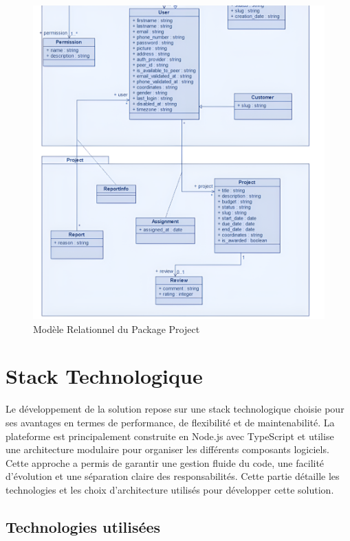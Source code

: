 {\begin{figure}[H]
\begin{center}
\includegraphics[width=15cm]{assets/diagrams/ProjectUC.png}
\end{center}
\caption{Modèle Relationnel du Package Project}
\end{figure}

\vspace{0.35cm}

\section{Stack Technologique}
Le développement de la solution repose sur une stack technologique choisie pour ses avantages en termes de performance, de flexibilité et de maintenabilité. La plateforme est principalement construite en Node.js avec TypeScript et utilise une architecture modulaire pour organiser les différents composants logiciels. Cette approche a permis de garantir une gestion fluide du code, une facilité d'évolution et une séparation claire des responsabilités. Cette partie détaille les technologies et les choix d'architecture utilisés pour développer cette solution.

\subsection*{Technologies utilisées}
}
